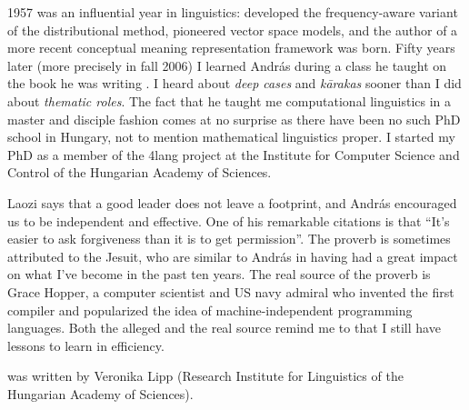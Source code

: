 \documentclass[11pt]{article}
\begin{document}
1957 was an influential year in linguistics: \cite{Harris:1957} developed the
frequency-aware variant of the distributional method, \cite{Osgood:1957}
pioneered vector space models, and the author of a more recent conceptual
meaning representation framework \citep{Kornai:2010,Kornai:2017} was born.
Fifty years later (more precisely in fall 2006) I learned András during a class
he taught on the book he was writing \citep{Kornai:2007}. I heard about
\emph{deep cases} and \emph{k\={a}rakas} sooner than I did about \emph{thematic
roles}. The fact that he taught me computational linguistics in a master and
disciple fashion comes at no surprise as there have been no such PhD school in
Hungary, not to mention mathematical linguistics proper.
I started my PhD as a member of the 4lang project at the Institute for Computer
Science and Control of the Hungarian Academy of Sciences.

Laozi says that a good leader does not leave a footprint, and András encouraged
us to be independent and effective. One of his remarkable citations is that
``It's easier to ask forgiveness than it is to get permission''. The proverb is
sometimes attributed to the Jesuit, who are similar to András in having had a
great impact on what I've become in the past ten years. The real source of the
proverb is Grace Hopper, a computer scientist and US navy admiral who invented
the first compiler and popularized the idea of machine-independent programming
languages. Both the alleged and the real source remind me to that I still have
lessons to learn in efficiency.


\smallskip

 was written by Veronika Lipp (Research Institute for
Linguistics of the Hungarian Academy of Sciences).



\end{document}
